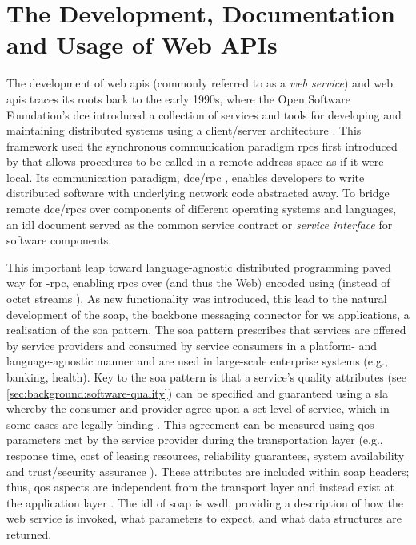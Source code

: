 \graphicspath{{mainmatter/background/figures/}}

\section{The Development, Documentation and Usage of Web APIs}
\label{ssec:background:api:usage}

The development of web \glspl{api} (commonly referred to as a \textit{web service}) and web \glspl{api} traces its roots back to the early 1990s, where  the Open Software Foundation's \gls{dce} introduced a collection of services and tools for developing and maintaining distributed systems using a client/server architecture \citep{Rosenberry:1992up}. This framework used the synchronous communication paradigm \glspl{rpc} first introduced by \citet{Nelson:1981ue} that allows procedures to be called in a remote address space as if it were local. Its communication paradigm, \gls{dce}/\gls{rpc} \citep{OpenSoftwareFoundation:1991vp}, enables developers to write distributed software with underlying network code abstracted away. To bridge remote \gls{dce}/\glspl{rpc} over components of different operating systems and languages, an \gls{idl} document served as the common service contract or \textit{service interface} for software components. 

This important leap toward language-agnostic distributed programming paved way for -\gls{rpc}, enabling \glspl{rpc} over  (and thus the Web) encoded using  (instead of octet streams \citep{OpenSoftwareFoundation:1991vp}). As new functionality was introduced, this lead to the natural development of the \gls{soap}, the backbone messaging connector for \gls{ws} applications, a realisation of the \gls{soa} \citep{Casati:2003vi} pattern. The \gls{soa} pattern prescribes that services are offered by service providers and consumed by service consumers in a platform- and language-agnostic manner and are used in large-scale enterprise systems (e.g., banking, health). Key to the \gls{soa} pattern is that a service's quality attributes (see \cref{sec:background:software-quality}) can be specified and guaranteed using a \gls{sla} whereby the consumer and provider agree upon a set level of service, which in some cases are legally binding \citep{Bass:2003wi}. This agreement can be measured using \gls{qos} parameters met by the service provider during the transportation layer (e.g., response time, cost of leasing resources, reliability guarantees, system availability and trust/security assurance \citep{Hwang:2017tr,Weerawarana:2005wx}). These attributes are included within \gls{soap} headers; thus, \gls{qos} aspects are independent from the transport layer and instead exist at the application layer \citep{Pautasso2008}. The \gls{idl} of \gls{soap} is \gls{wsdl}, providing a description of how the web service is invoked, what parameters to expect, and what data structures are returned.

